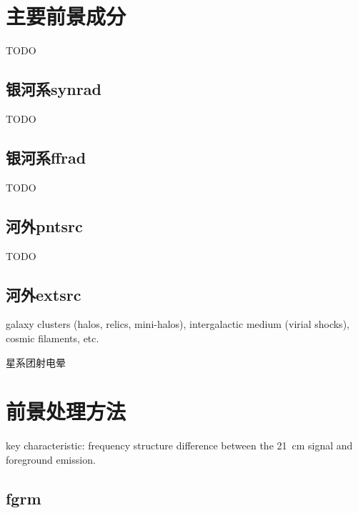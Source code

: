 \section{主要前景成分}

TODO

\subsection{银河系\acl*{synrad}}  %

TODO

\subsection{银河系\acl*{ffrad}}  %

TODO

\subsection{河外\acl*{pntsrc}}  %

TODO

\subsection{河外\acl{extsrc}}  %

galaxy clusters (halos, relics, mini-halos),
intergalactic medium (virial shocks),
cosmic filaments, etc.

星系团射电晕


\section{前景处理方法}

key characteristic: frequency structure difference between
the 21~cm signal and foreground emission.

\subsection{\acl*{fgrm}}  %

